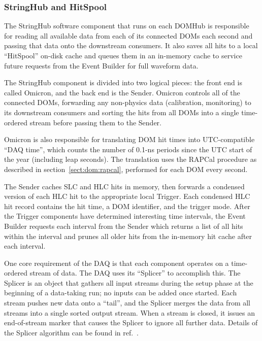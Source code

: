 \subsubsection{StringHub and HitSpool}
\label{sec:domhub_hitspool}

The StringHub software component that runs on each DOMHub is responsible
for reading all available data from each of its connected DOMs each second
and passing that data onto the downstream consumers.  It also saves all
hits to a local ``HitSpool'' on-disk cache and queues them in an
in-memory cache to service future requests from the Event Builder for full
waveform data.

The StringHub component is divided into two logical pieces: the front
end is called Omicron, and the back end is the Sender. Omicron controls all
of the connected DOMs, forwarding any 
non-physics data (calibration, monitoring) to its downstream consumers and
sorting the hits from all 
DOMs into a single time-ordered stream before passing them to the Sender.  

Omicron is also responsible for translating DOM hit times into
UTC-compatible ``DAQ time'', which counts the number of 0.1-ns periods
since the UTC start of the year (including leap seconds).  The translation
uses the RAPCal procedure as described in section~\ref{sect:dom:rapcal},
performed for each DOM every second.  

The Sender caches SLC and HLC hits in memory, then forwards a
condensed version of each HLC hit to the appropriate local Trigger. Each
condensed HLC hit record contains the hit time, a DOM identifier, and the
trigger mode.  After the
Trigger components have determined interesting time intervals, 
the Event Builder requests each interval from the Sender which returns a list of
all hits within the interval and prunes all older hits from the in-memory hit
cache after each interval.

One core requirement of the DAQ is that each component operates on a
time-ordered stream of data.  The DAQ uses its ``Splicer'' to accomplish
this.  The Splicer is an object that gathers all input streams
during the setup phase at the beginning of a data-taking run; no inputs can
be added once started.  Each stream 
pushes new data onto a ``tail'', and the Splicer merges the data from all
streams into a single sorted output stream.  When a stream is closed, it
issues an end-of-stream marker that causes the Splicer to
ignore all further data.  Details of the Splicer algorithm can be found in
ref.~\cite{vlvnt13_trigger}.  

